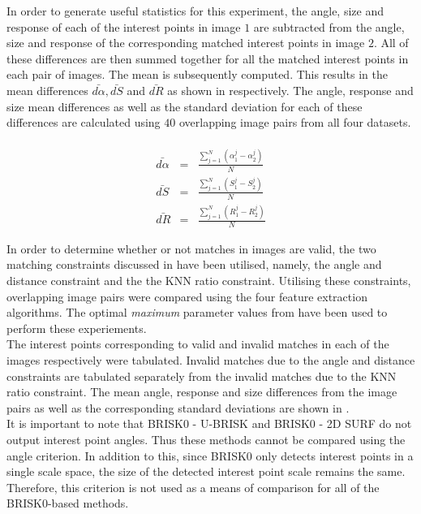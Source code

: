 \documentclass{article}
\begin{document}
In order to generate useful statistics for this experiment, the angle, size and response of each of the interest points in image $1$ are subtracted from the angle, size and response of the corresponding matched interest points in image $2$. All of these differences are then summed together for all the matched interest points in each pair of images. The mean is subsequently computed. This results in the mean differences $\bar{d\alpha}, \bar{dS}$ and $\bar{dR}$ as shown in  respectively. The angle, response and size mean differences as well as the standard deviation for each of these differences are calculated using $40$ overlapping image pairs from all four datasets.\\ \\

\begin{eqnarray}
\bar{d\alpha} &=& \frac{\sum_{j=1}^N (\alpha_1^j - \alpha_2^j)}{N}\\
\bar{dS} &=& \frac{\sum_{j=1}^N (S_1^j - S_2^j)}{N}\\
\bar{dR} &=& \frac{\sum_{j=1}^N (R_1^j - R_2^j)}{N}
\end{eqnarray}

In order to determine whether or not matches in images are valid, the two matching constraints discussed in  have been utilised, namely, the angle and distance constraint and the the KNN ratio constraint. Utilising these constraints, overlapping image pairs were compared using the four feature extraction algorithms. The optimal \textit{maximum} parameter values from  have been used to perform these experiements. \\

The interest points corresponding to valid and invalid matches in each of the images respectively were tabulated. Invalid matches due to the angle and distance constraints are tabulated separately from the invalid matches due to the KNN ratio constraint. The mean angle, response and size differences from the image pairs as well as the corresponding standard deviations are shown in .\\

It is important to note that BRISK0 - U-BRISK and BRISK0 - 2D SURF do not output interest point angles. Thus these methods cannot be compared using the angle criterion. In addition to this, since BRISK0 only detects interest points in a single scale space, the size of the detected interest point scale remains the same. Therefore, this criterion is not used as a means of comparison for all of the BRISK0-based methods.\\
\end{document}
